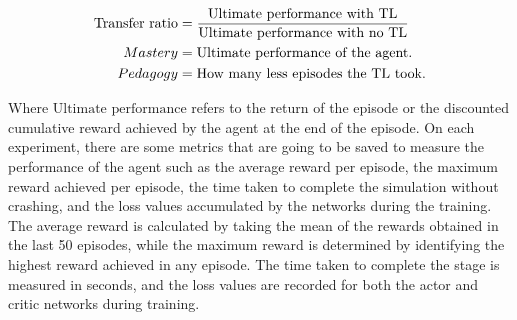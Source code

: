 \begin{equation}
    \centering
    \begin{split}
        \text{Transfer ratio} & = \frac{\text{Ultimate performance with TL}}{\text{Ultimate performance with no TL}} \\
        Mastery               & = \text{Ultimate performance of the agent.}                                          \\
        Pedagogy              & = \text{How many less episodes the TL took.}
    \end{split}
    \label{eq:tl_metrics}
\end{equation}

Where $\text{Ultimate performance}$ refers to the return of the episode or the discounted cumulative reward achieved by the agent at the end of the episode. On each experiment, there are some metrics that are going to be saved to measure the performance of the agent such as the average reward per episode, the maximum reward achieved per episode, the time taken to complete the simulation without crashing, and the loss values accumulated by the networks during the training. The average reward is calculated by taking the mean of the rewards obtained in the last 50 episodes, while the maximum reward is determined by identifying the highest reward achieved in any episode. The time taken to complete the stage is measured in seconds, and the loss values are recorded for both the actor and critic networks during training.
